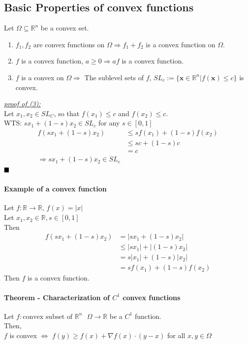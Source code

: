 \documentclass[11pt]{article}
\newcommand{\ti}[1]{\textit{#1}}
\newcommand{\tb}[1]{\textbf{#1}}
\newcommand{\real}[0]{\mathbb{R}}
\newcommand{\under}[1]{\underline{#1}}
\newcommand{\vx}[0]{\tb{x}}
\newcommand{\qed}[0]{$\hfill\blacksquare$}
\begin{document}
\subsection{Basic Properties of convex functions}
Let $\Omega \subseteq \real^n$ be a convex set.
\begin{enumerate}
	\item $f_1, f_2$ are convex functions on $\Omega \Rightarrow f_1 + f_2$ is a convex function on $\Omega$.
	\item $f$ is a convex function, $a \geq 0 \Rightarrow af$ is a convex function.
	\item $f$ is a convex on $\Omega \Rightarrow$ The sublevel sets of $f$, $SL_c:=\{\vx \in \real^n | f(\vx) \leq c\}$ is convex.
\end{enumerate}
\under{\ti{proof of (3):}} \\
Let $x_1, x_2 \in SL_C$, so that $f(x_1) \leq c$ and $f(x_2) \leq c$. \\
WTS: $sx_1 + (1-s)x_2 \in SL_c$ for any $s \in [0,1]$
\begin{align*}
	f(sx_1 + (1-s)x_2) &\leq sf(x_1) + (1-s)f(x_2) \tag{$f$ is convex}\\
	&\leq sc + (1-s)c \\
	&= c \\
\Rightarrow sx_1 + (1-s)x_2 \in SL_c
\end{align*}
\qed

\paragraph{Example of a convex function}
Let $f: \real \rightarrow \real, \,f(x) = |x|$ \\
Let $x_1, x_2 \in \real, s \in [0,1]$ \\
Then
\begin{align*}
	f(sx_1 + (1-s)x_2) &= |sx_1 + (1-s)x_2| \\
	&\leq |sx_1| + |(1-s)x_2| \tag{by Triangle Inequality}\\
	&= s|x_1| + (1-s)|x_2| \\
	&= sf(x_1) + (1-s)f(x_2)
\end{align*}
Then $f$ is a convex function.
\paragraph{Theorem - Characterization of $C^1$ convex functions}
Let $f: \text{convex subset of $\real^n$ } \Omega \rightarrow \real$ be a $C^1$ function. \\
Then,\\
$f$ is convex $\iff$ $f(y) \geq f(x) + \nabla f(x)\cdot(y-x)$ 
for all $x,y \in \Omega$
\end{document}
